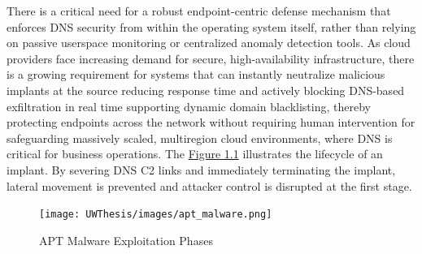 \documentclass [11pt, proquest] {uwthesis}[2020/02/24]
\begin{document}
There is a critical need for a robust endpoint-centric defense mechanism that enforces DNS security from within the operating system itself, rather than relying on passive userspace monitoring or centralized anomaly detection tools. As cloud providers face increasing demand for secure, high-availability infrastructure, there is a growing requirement for systems that can instantly neutralize malicious implants at the source reducing response time and actively blocking DNS-based exfiltration in real time supporting dynamic domain blacklisting, thereby protecting endpoints across the network without requiring human intervention for safeguarding massively scaled, multiregion cloud environments, where DNS is critical for business operations.
The \hyperref[sec:apt_malware_flow]{Figure 1.1} illustrates the lifecycle of an implant. By severing DNS C2 links and immediately terminating the implant, lateral movement is prevented and attacker control is disrupted at the first stage.
\begin{figure}[H]
\centering
\texttt{[image: UWThesis/images/apt\_malware.png]}
\caption{APT Malware Exploitation Phases}
\label{sec:apt_malware_flow}
\end{figure}

\end{document}
